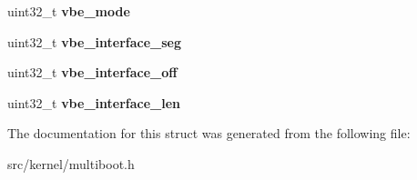 \begin{DoxyCompactItemize}
uint32\+\_\+t {\bfseries vbe\+\_\+mode}
\item 
\mbox{\label{structmultiboot__info_ab872b88be8479e38e3cf67d0a6197ab9}} 
uint32\+\_\+t {\bfseries vbe\+\_\+interface\+\_\+seg}
\item 
\mbox{\label{structmultiboot__info_aa2a8d6ccfd9304d963171584c1ba310e}} 
uint32\+\_\+t {\bfseries vbe\+\_\+interface\+\_\+off}
\item 
\mbox{\label{structmultiboot__info_a0dc4531305cde35d6664030732bc3fc6}} 
uint32\+\_\+t {\bfseries vbe\+\_\+interface\+\_\+len}
\end{DoxyCompactItemize}


The documentation for this struct was generated from the following file\+:\begin{DoxyCompactItemize}
\item 
src/kernel/multiboot.\+h\end{DoxyCompactItemize}
